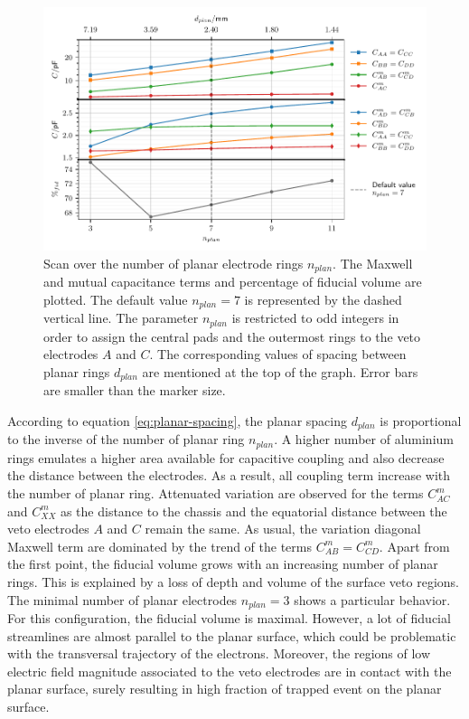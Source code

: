 \begin{figure}
\centering
\includegraphics[scale=1]{Figures/ElectrodesScan/capacitance_fiducial_n_top.pdf}
\caption{Scan over the number of planar electrode rings $n_{plan}$. The Maxwell and mutual capacitance terms and percentage of fiducial volume are plotted. The default value $n_{plan}=7$ is represented by the dashed vertical line. The parameter $n_{plan}$ is restricted to odd integers in order to assign the central pads and the outermost rings to the veto electrodes $A$ and $C$. The corresponding values of spacing between planar rings $d_{plan}$ are mentioned at the top of the graph. Error bars are smaller than the marker size.}
\label{fig:capacitance-fiducial-n-top}
\end{figure}

According to equation \ref{eq:planar-spacing}, the planar spacing $d_{plan}$ is proportional to the inverse of the number of planar ring $n_{plan}$. A higher number of aluminium rings emulates a higher area available for capacitive coupling and also decrease the distance between the electrodes. As a result, all coupling term increase with the number of planar ring. Attenuated variation are observed for the terms $C_{AC}^m$ and $C_{XX}^m$ as the distance to the chassis  and the equatorial distance between the veto electrodes $A$ and $C$ remain the same. As usual, the variation diagonal Maxwell term are dominated by the trend of the terms $C_{AB}^m=C_{CD}^m$.
Apart from the first point, the fiducial volume grows with an increasing number of planar rings. This is explained by a loss of depth and volume of the surface veto regions. 
The minimal number of planar electrodes $n_{plan}=3$ shows a particular behavior. For this configuration, the fiducial volume is maximal. However, a lot of fiducial streamlines are almost parallel to the planar surface, which could be problematic with the transversal trajectory of the electrons. Moreover, the regions of low electric field magnitude associated to the veto electrodes are in contact with the planar surface, surely resulting in high fraction of trapped event on the planar surface. 

